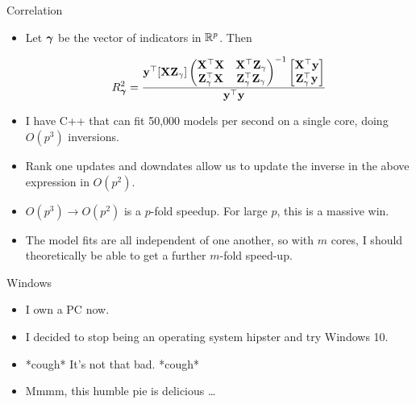 \documentclass{beamer}
\begin{document}
\begin{frame}{Correlation}

\begin{itemize}
\item Let ${\boldsymbol \gamma}$ be the vector of indicators in ${\mathbb{R}}^p$. Then

\begin{equation*}
R^2_{\boldsymbol \gamma} = \frac{{\bf y}^\top [{\bf X} {\bf Z}_\gamma]
\begin{pmatrix}
{\bf X}^\top {\bf X} & {\bf X}^\top {\bf Z}_\gamma \\
{\bf Z}_\gamma ^\top {\bf X} & {\bf Z}_\gamma^\top {\bf Z}_\gamma
\end{pmatrix}^{-1}
\begin{bmatrix}
{\bf X}^\top {\bf y} \\
{\bf Z}_\gamma^\top {\bf y}
\end{bmatrix}}{{\bf y}^\top {\bf y}}
\end{equation*}

\item I have C++ that can fit 50,000 models per second on a single core, doing $O(p^3)$ inversions. 
\item Rank one updates and downdates allow us to update the inverse in the above expression in $O(p^2)$.
\item $O(p^3) \to O(p^2)$ is a $p$-fold speedup. For large $p$, this is a massive win.
\item The model fits are all independent of one another, so with $m$ cores, I should theoretically be able
			to get a further $m$-fold speed-up.
\end{itemize}
\end{frame}

\begin{frame}{Windows}
\begin{itemize}
\item I own a PC now.
\item I decided to stop being an operating system hipster and try Windows 10.
\item *cough* It's not that bad. *cough*
\item Mmmm, this humble pie is delicious \ldots
\end{itemize}
\end{frame}
\end{document}
